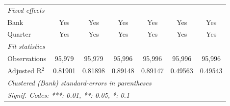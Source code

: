\begin{tabular}{lcccccc}
   \midrule
   \emph{Fixed-effects}\\
   Bank                           & Yes             & Yes             & Yes            & Yes            & Yes             & Yes\\  
   Quarter                        & Yes             & Yes             & Yes            & Yes            & Yes             & Yes\\  
   \midrule
   \emph{Fit statistics}\\
   Observations                   & 95,979          & 95,979          & 95,996         & 95,996         & 95,996          & 95,996\\  
   Adjusted R$^2$                 & 0.81901         & 0.81898         & 0.89148        & 0.89147        & 0.49563         & 0.49543\\  
   \midrule \midrule
   \multicolumn{7}{l}{\emph{Clustered (Bank) standard-errors in parentheses}}\\
   \multicolumn{7}{l}{\emph{Signif. Codes: ***: 0.01, **: 0.05, *: 0.1}}\\
\end{tabular}
\par\endgroup


